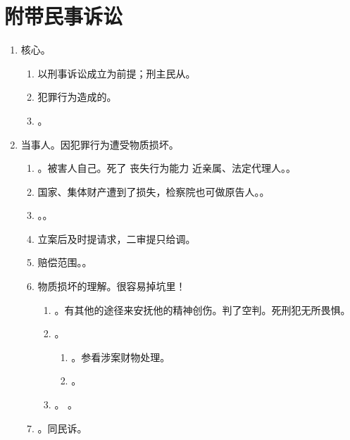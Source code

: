\section{附带民事诉讼}
\begin{enumerate}
  \item 核心。
        \begin{enumerate}
          \item 以刑事诉讼成立为前提；刑主民从。
          \item 犯罪行为造成的。
          \item {}。
        \end{enumerate}
  \item 当事人。因犯罪行为遭受物质损坏。
        \begin{enumerate}
          \item {}。被害人自己。死了 \hz 丧失行为能力 \yjt 近亲属、法定代理人。。
          \item 国家、集体财产遭到了损失，检察院也可做原告人。。
          \item {}。。
          \item 立案后及时提请求，二审提只给调。
          \item 赔偿范围。。
          \item 物质损坏的理解。很容易掉坑里！
                \begin{enumerate}
                  \item {}。\yi 有其他的途径来安抚他的精神创伤。\er 判了空判。死刑犯无所畏惧。
                  \item {}。
                        \begin{enumerate}
                          \item {}。参看涉案财物处理。
                          \item {}。
                        \end{enumerate}
                  \item {}。
                        。
                \end{enumerate}
          \item {}。同民诉。

\end{enumerate}
\end{enumerate}
